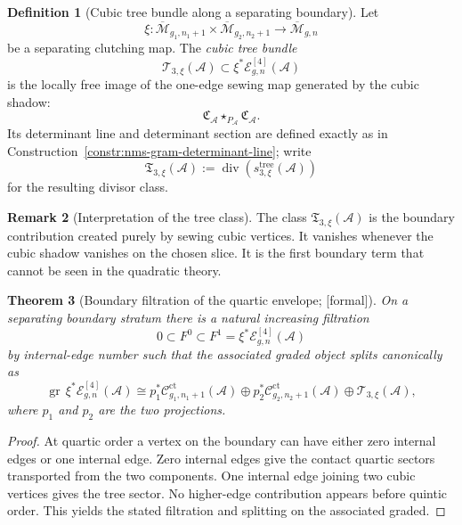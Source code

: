 \documentclass[11pt,oneside]{memoir}
\numberwithin{equation}{chapter}
\newtheorem{theorem}{Theorem}[chapter]
\theoremstyle{definition}
\newtheorem{definition}[theorem]{Definition}
\newtheorem{remark}[theorem]{Remark}
\newcommand{\ClaimStatusProvedHere}{\textnormal{[formal]}}
\newcommand{\cA}{\mathcal A}
\begin{document}
\begin{definition}[Cubic tree bundle along a separating boundary]
\label{def:nms-cubic-tree-bundle}
Let
\[
\xi\colon \overline{\mathcal M}_{g_1,n_1+1}\times \overline{\mathcal M}_{g_2,n_2+1}
\longrightarrow \overline{\mathcal M}_{g,n}
\]
be a separating clutching map.  The \emph{cubic tree bundle}
\[
\mathscr T_{3,\xi}(\cA)
\subset
\xi^*\mathscr E_{g,n}^{[4]}(\cA)
\]
is the locally free image of the one-edge sewing map generated by the cubic shadow:
\[
\mathfrak C_{\cA}\star_{P_{\cA}}\mathfrak C_{\cA}.
\]
Its determinant line and determinant section are defined exactly as in Construction~\ref{constr:nms-gram-determinant-line}; write
\[
\mathfrak T_{3,\xi}(\cA)
:=
\operatorname{div}(s_{3,\xi}^{\mathrm{tree}}(\cA))
\]
for the resulting divisor class.
\end{definition}

\begin{remark}[Interpretation of the tree class]
\label{rem:nms-tree-class-interpretation}
The class $\mathfrak T_{3,\xi}(\cA)$ is the boundary contribution created purely by sewing cubic vertices.  It vanishes whenever the cubic shadow vanishes on the chosen slice.  It is the first boundary term that cannot be seen in the quadratic theory.
\end{remark}

\begin{theorem}[Boundary filtration of the quartic envelope; \ClaimStatusProvedHere]
\label{thm:nms-boundary-filtration-quartic-envelope}
On a separating boundary stratum there is a natural increasing filtration
\[
0\subset F^0\subset F^1=\xi^*\mathscr E_{g,n}^{[4]}(\cA)
\]
by internal-edge number such that the associated graded object splits canonically as
\begin{equation}
\label{eq:nms-associated-graded-boundary}
\operatorname{gr}\,\xi^*\mathscr E_{g,n}^{[4]}(\cA)
\cong
p_1^*\mathscr C_{g_1,n_1+1}^{\mathrm{ct}}(\cA)
\oplus
p_2^*\mathscr C_{g_2,n_2+1}^{\mathrm{ct}}(\cA)
\oplus
\mathscr T_{3,\xi}(\cA),
\end{equation}
where $p_1$ and $p_2$ are the two projections.
\end{theorem}

\begin{proof}
At quartic order a vertex on the boundary can have either zero internal edges or one internal edge.  Zero internal edges give the contact quartic sectors transported from the two components.  One internal edge joining two cubic vertices gives the tree sector.  No higher-edge contribution appears before quintic order.  This yields the stated filtration and splitting on the associated graded.\qedhere
\end{proof}
\end{document}
